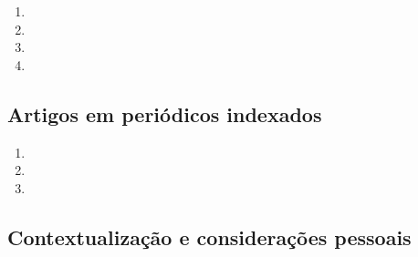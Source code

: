 \begin{enumerate}
	\item {}
	\item {}
	\item {}
	\item {}
\end{enumerate}

\subsection*{Artigos em periódicos indexados}

\begin{enumerate}
	\item {}
	\item {}
	\item {}
	
\end{enumerate}

\subsection*{Contextualização e considerações pessoais}

